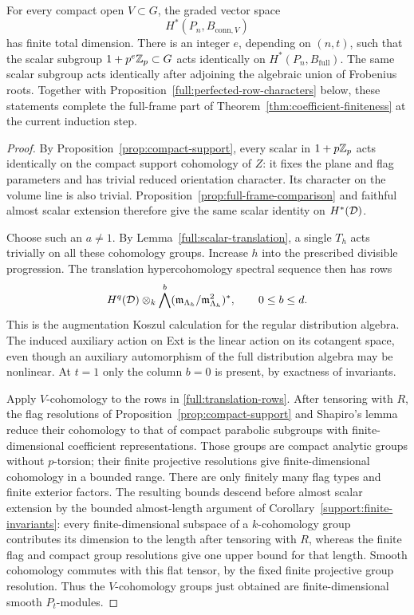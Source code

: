 \begin{proposition}
\label{full:joint-completion}
For every compact open $V\subset G$, the graded vector space
\[
 H^*(P_n,B_{\mathrm{conn},V})
\]
has finite total dimension.  There is an integer $e$, depending on
$(n,t)$, such that the scalar subgroup $1+p^e\mathbb Z_p\subset G$ acts
identically on $H^*(P_n,B_{\mathrm{full}})$.  The same scalar subgroup
acts identically after adjoining the algebraic union of Frobenius
roots.  Together with Proposition~\ref{full:perfected-row-characters}
below, these statements complete the full-frame part of
Theorem~\ref{thm:coefficient-finiteness} at the current induction step.
\end{proposition}

\begin{proof}
By Proposition~\ref{prop:compact-support}, every scalar in
$1+p\mathbb Z_p$ acts identically on the compact support cohomology of $Z$:
it fixes the plane and flag parameters and has trivial reduced
orientation character.  Its character on the volume line is also
trivial.  Proposition~\ref{prop:full-frame-comparison} and faithful
almost scalar extension therefore give the same scalar identity on
$H^*(\mathcal D)$.

Choose such an $a\ne1$.  By
Lemma~\ref{full:scalar-translation}, a single $T_h$ acts trivially on
all these cohomology groups.  Increase $h$ into the prescribed
divisible progression.  The translation hypercohomology spectral
sequence then has rows
\begin{equation}
\label{full:translation-rows}
 H^q(\mathcal D)\otimes_k
 \bigwedge^b(\mathfrak m_{\Lambda_h}/\mathfrak m_{\Lambda_h}^2)^*,
 \qquad 0\leq b\leq d.
\end{equation}
This is the augmentation Koszul calculation for the regular
distribution algebra.  The induced auxiliary action on Ext is the
linear action on its cotangent space, even though an auxiliary
automorphism of the full distribution algebra may be nonlinear.  At
$t=1$ only the column $b=0$ is present, by exactness of invariants.

Apply $V$-cohomology to the rows in
\eqref{full:translation-rows}.  After tensoring with $R$, the flag
resolutions of Proposition~\ref{prop:compact-support} and Shapiro's
lemma reduce their cohomology to that of compact parabolic subgroups
with finite-dimensional coefficient representations.  Those groups
are compact analytic groups without $p$-torsion; their finite
projective resolutions give finite-dimensional cohomology in a
bounded range.  There are only finitely many flag types and finite
exterior factors.  The resulting bounds descend before almost scalar
extension by the bounded almost-length argument of
Corollary~\ref{support:finite-invariants}: every finite-dimensional
subspace of a $k$-cohomology group contributes its dimension to the
length after tensoring with $R$, whereas the finite flag and compact
group resolutions give one upper bound for that length.
Smooth cohomology commutes with this flat tensor, by the fixed finite
projective group resolution.  Thus the $V$-cohomology groups just
obtained are finite-dimensional smooth $P_t$-modules.


\end{proof}
